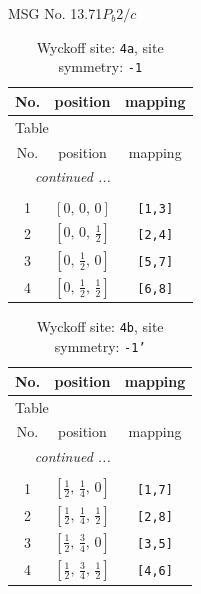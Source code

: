 \documentclass[fleqn,8pt]{jsarticle}
\begin{document}
\setcounter{MaxMatrixCols}{32}

\renewcommand{\tablename}{Table~}
\renewcommand{\figurename}{Figure~}
\begin{center}
\LARGE
MSG No. 13.71\quad$P_{b}2/c$
\end{center}
\renewcommand{\arraystretch}{1.2}
\begin{longtable}{ccc}
\caption{Wyckoff site: {\tt 4a}, site symmetry: {\tt -1}}
 \\
 \hline \hline
No. & position & mapping \\ \hline \endfirsthead

\multicolumn{2}{l}{\tablename\ \thetable{}} \\
 \hline \hline
No. & position & mapping \\ \hline \endhead

 \hline \hline
\multicolumn{2}{r}{\footnotesize\it continued ...} \\ \endfoot

 \hline \hline
\multicolumn{2}{r}{} \\ \endlastfoot

1 & $\left[ 0,\, 0,\, 0 \right]$ & {\tt [1,3]} \\ \hline
2 & $\left[ 0,\, 0,\, \frac{1}{2} \right]$ & {\tt [2,4]} \\ \hline
3 & $\left[ 0,\, \frac{1}{2},\, 0 \right]$ & {\tt [5,7]} \\ \hline
4 & $\left[ 0,\, \frac{1}{2},\, \frac{1}{2} \right]$ & {\tt [6,8]} \\
\end{longtable}
\renewcommand{\arraystretch}{1.2}
\begin{longtable}{ccc}
\caption{Wyckoff site: {\tt 4b}, site symmetry: {\tt -1'}}
 \\
 \hline \hline
No. & position & mapping \\ \hline \endfirsthead

\multicolumn{2}{l}{\tablename\ \thetable{}} \\
 \hline \hline
No. & position & mapping \\ \hline \endhead

 \hline \hline
\multicolumn{2}{r}{\footnotesize\it continued ...} \\ \endfoot

 \hline \hline
\multicolumn{2}{r}{} \\ \endlastfoot

1 & $\left[ \frac{1}{2},\, \frac{1}{4},\, 0 \right]$ & {\tt [1,7]} \\ \hline
2 & $\left[ \frac{1}{2},\, \frac{1}{4},\, \frac{1}{2} \right]$ & {\tt [2,8]} \\ \hline
3 & $\left[ \frac{1}{2},\, \frac{3}{4},\, 0 \right]$ & {\tt [3,5]} \\ \hline
4 & $\left[ \frac{1}{2},\, \frac{3}{4},\, \frac{1}{2} \right]$ & {\tt [4,6]} \\
\end{longtable}
\end{document}

